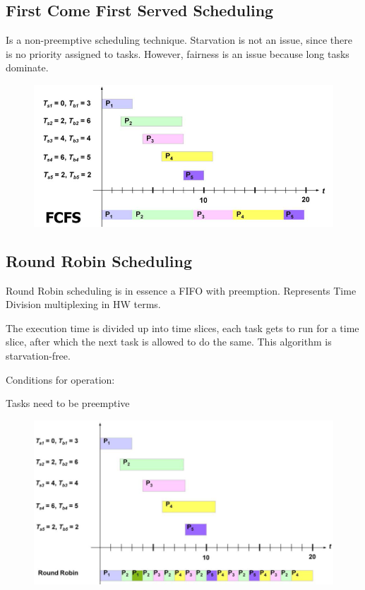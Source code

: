 	\subsection{First Come First Served Scheduling}
		Is a non-preemptive scheduling technique. Starvation is not an issue, since there is no priority assigned to tasks. However, fairness is an issue because long tasks dominate.
		\begin{figure}[H]\centering
			\includegraphics[scale=0.5]{./pictures/firstComeFirstServe.png}
		\end{figure}
			
	\subsection{Round Robin Scheduling}
		Round Robin scheduling is in essence a FIFO with preemption. Represents Time Division multiplexing in HW terms.
		
		The execution time is divided up into time slices, each task gets to run for a time slice, after which the next task is allowed to do the same. This algorithm is starvation-free.

		Conditions for operation:
		\begin{compactitem}
		  \item Tasks need to be preemptive
		\end{compactitem}
		
		\begin{figure}[H]\centering
			\includegraphics[scale=0.5]{./pictures/roundRobin.png}
		\end{figure}
		
